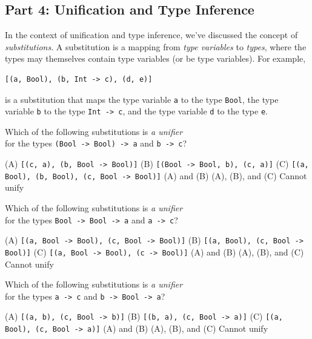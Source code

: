 \documentclass[addpoints]{exam}
\begin{document}
\begin{questions}
\newpage

\subsection*{\textbf{Part 4: Unification and Type Inference}}

In the context of unification and type inference, we've discussed the concept of \emph{substitutions}.  A substitution is a mapping from \emph{type variables} to \emph{types}, where the types may themselves contain type variables (or be type variables).  For example,
\begin{verbatim}
[(a, Bool), (b, Int -> c), (d, e)]
\end{verbatim}
is a substitution that maps the type variable \verb|a| to the type \verb|Bool|, the type variable \verb|b| to the type \verb|Int -> c|, and the type variable \verb|d| to the type \verb|e|.

\question[3] Which of the following substitutions is \emph{a unifier} \\ for the types \texttt{(Bool -> Bool) -> a} and \texttt{b -> c}?

\begin{checkboxes}
  \CorrectChoice (A) \texttt{[(c, a), (b, Bool -> Bool)]}
  \choice (B) \texttt{[(Bool -> Bool, b), (c, a)]}
  \choice (C) \texttt{[(a, Bool), (b, Bool), (c, Bool -> Bool)]}
  \choice (A) and (B)
  \choice (A), (B), and (C)
  \choice Cannot unify
\end{checkboxes}

\question[3] Which of the following substitutions is \emph{a unifier} \\ for the types \texttt{Bool -> Bool -> a} and \texttt{a -> c}?

\begin{checkboxes}
  \choice (A) \texttt{[(a, Bool -> Bool), (c, Bool -> Bool)]}
  \CorrectChoice (B) \texttt{[(a, Bool), (c, Bool -> Bool)]}
  \choice (C) \texttt{[(a, Bool -> Bool), (c -> Bool)]}
  \choice (A) and (B)
  \choice (A), (B), and (C)
  \choice Cannot unify
\end{checkboxes}

\question[3] Which of the following substitutions is \emph{a unifier} \\ for the types \texttt{a -> c} and \texttt{b -> Bool -> a}?

\begin{checkboxes}
  \choice (A) \texttt{[(a, b), (c, Bool -> b)]}
  \choice (B) \texttt{[(b, a), (c, Bool -> a)]}
  \choice (C) \texttt{[(a, Bool), (c, Bool -> a)]}
  \CorrectChoice (A) and (B)
  \choice (A), (B), and (C)
  \choice Cannot unify
\end{checkboxes}


\end{questions}
\end{document}
